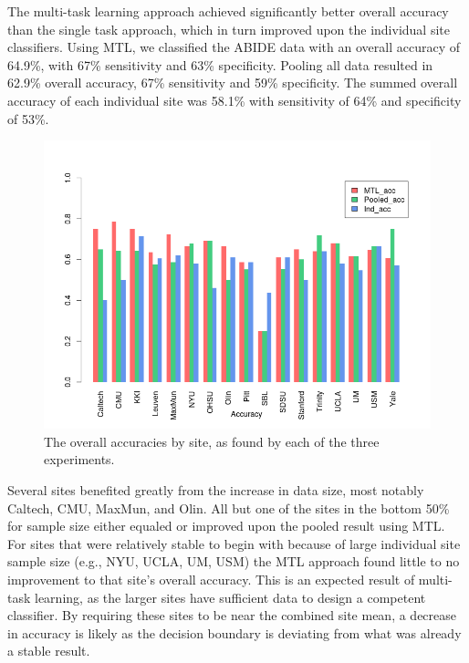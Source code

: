 \documentclass{llncs}
\begin{document}
The multi-task learning approach achieved significantly better overall accuracy than the single task approach, which in turn improved upon the individual site classifiers. Using MTL, we classified the ABIDE data with an  overall accuracy of 64.9\%, with 67\% sensitivity and 63\% specificity.  Pooling all data resulted in 62.9\% overall accuracy, 67\% sensitivity and 59\% specificity. The summed overall accuracy of each individual site was 58.1\% with sensitivity of 64\% and specificity of 53\%. 
\begin{figure}
	\centering
	\includegraphics[scale = .4]{acc_bar.png}
	\caption{The overall accuracies by site, as found by each of the three experiments. }
	\label{fig:acc_bar}
\end{figure}


Several sites benefited greatly from the increase in data size, most notably Caltech, CMU, MaxMun, and Olin.  All but one of the sites in the bottom 50\% for sample size either equaled or improved upon the pooled result using MTL.  For sites that were relatively stable to begin with because of large individual site sample size (e.g., NYU, UCLA, UM, USM) the MTL approach found little to no improvement to that site's overall accuracy. This is an expected result of multi-task learning, as the larger sites have sufficient data to design a competent classifier.  By requiring these sites to be near the combined site mean, a decrease in accuracy is likely as the decision boundary is deviating from what was already a stable result. 
\end{document}
